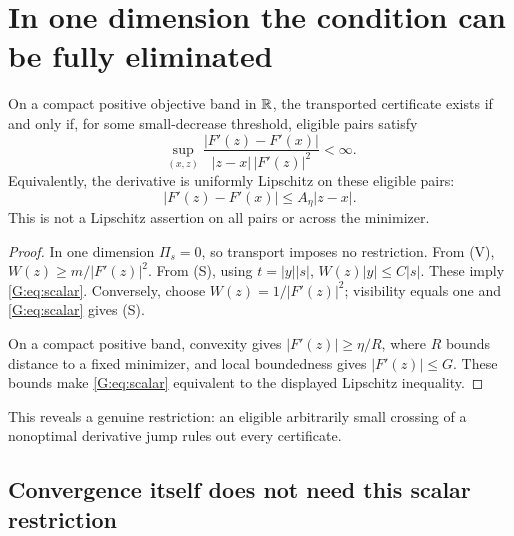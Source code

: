 \section{In one dimension the condition can be fully eliminated}
\begin{proposition}
On a compact positive objective band in $\mathbb R$, the transported certificate exists if and only if, for some small-decrease threshold, eligible pairs satisfy
\begin{equation}
 \sup_{(x,z)}\frac{|F'(z)-F'(x)|}{|z-x|\,|F'(z)|^2}<\infty. \label{G:eq:scalar}
\end{equation}
Equivalently, the derivative is uniformly Lipschitz on these eligible pairs:
\[
 |F'(z)-F'(x)|\le A_\eta|z-x|.
\]
This is not a Lipschitz assertion on all pairs or across the minimizer.
\end{proposition}
\begin{proof}
In one dimension $\Pi_s=0$, so transport imposes no restriction. From (V),
$W(z)\ge m/|F'(z)|^2$. From (S), using $t=|y||s|$,
$W(z)|y|\le C|s|$. These imply \eqref{G:eq:scalar}. Conversely, choose
$W(z)=1/|F'(z)|^2$; visibility equals one and \eqref{G:eq:scalar} gives (S).

On a compact positive band, convexity gives $|F'(z)|\ge\eta/R$, where $R$ bounds distance to a fixed minimizer, and local boundedness gives $|F'(z)|\le G$. These bounds make \eqref{G:eq:scalar} equivalent to the displayed Lipschitz inequality.
\end{proof}
This reveals a genuine restriction: an eligible arbitrarily small crossing of a nonoptimal derivative jump rules out every certificate.



\subsection{Convergence itself does not need this scalar restriction}

